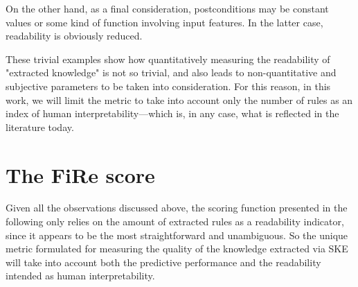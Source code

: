 \documentclass{article}
\newcommand{\fire}{FiRe}
\begin{document}
On the other hand, as a final consideration, postconditions may be constant values or some kind of function involving input features.
%
In the latter case, readability is obviously reduced.

These trivial examples show how quantitatively measuring the readability of "extracted knowledge" is not so trivial, and also leads to non-quantitative and subjective parameters to be taken into consideration. For this reason, in this work, we will limit the metric to take into account only the number of rules as an index of human interpretability---which is, in any case, what is reflected in the literature today.

\section{The \fire{} score}\label{sec:fire}

Given all the observations discussed above, the scoring function presented in the following only relies on the amount of extracted rules as a readability indicator, since it appears to be the most straightforward and unambiguous.
%
So the unique metric formulated for measuring the quality of the knowledge extracted via SKE will take into account both the predictive performance and the readability intended as human interpretability.
\end{document}
